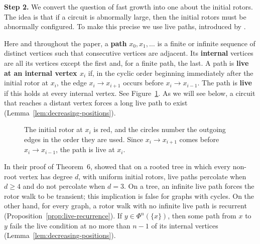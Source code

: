 \documentclass[11pt]{amsart}
\theoremstyle{plain}
\theoremstyle{definition}
\newcommand{\defn}[1]{\textbf{#1}}
\begin{document}
	\medskip
	
	\noindent\textbf{Step 2.}  We convert the question of fast growth into one
	about the initial rotors.  The idea is that if a circuit is abnormally
	large, then the initial rotors must be abnormally configured.  To make this
	precise we use live paths, introduced by \citet[Section~2]{AngelHolroyd2011}.
	
	Here and throughout the paper, a \defn{path} $x_0,x_1,\ldots$ is a finite or
	infinite sequence of distinct vertices such that consecutive vertices are
	adjacent.  Its \defn{internal} vertices are all its vertices except the first
	and, for a finite path, the last.  A path is \defn{live at an internal vertex
		$x_i$} if, in the cyclic order beginning immediately after the initial rotor
	at $x_i$, the edge $x_i\to x_{i+1}$ occurs before $x_i\to x_{i-1}$.  The path
	is \defn{live} if this holds at every internal vertex.  See
	Figure~\ref{fig:live-path}.  As we
	will see below, a circuit that reaches a distant vertex forces a long live
	path to exist (Lemma~\ref{lem:decreasing-positions}).
	
	\begin{figure}[!ht]
		\centering
		\caption{The initial rotor at $x_i$ is red, and the circles number the
			outgoing edges in the order they are used.  Since $x_i\to x_{i+1}$ comes
			before $x_i\to x_{i-1}$, the path is live at $x_i$.}
		\label{fig:live-path}
	\end{figure}
	
	In their proof of Theorem~6, \citet{AngelHolroyd2011} showed that on a
	rooted tree in which every non-root vertex has degree $d$, with uniform
	initial rotors, live paths percolate when $d\geq4$ and do not percolate when
	$d=3$.  On a tree, an infinite live path
	forces the rotor walk to be transient; this implication is false for graphs
	with cycles.  On the other hand, for every graph, a rotor walk with no infinite live
	path is recurrent (Proposition~\ref{prop:live-recurrence}).  If
	$y\in\Phi^n(\{x\})$, then some path from $x$ to $y$ fails the live condition
	at no more than $n-1$ of its internal vertices
	(Lemma~\ref{lem:decreasing-positions}). 
	
\end{document}
